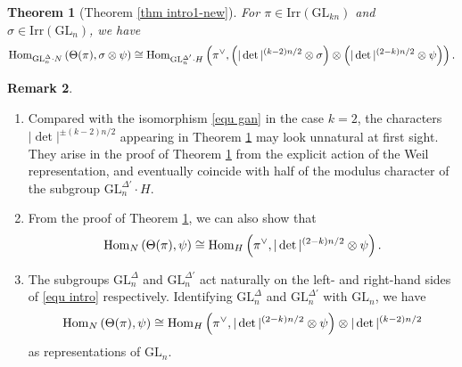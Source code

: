 \documentclass[11pt,reqno]{amsart}
\renewcommand{\1}{{\mathbf{1}}} \newcommand{\sB}{{\mathscr{B}}}
\newcommand{\GL}{{\mathrm{GL}}}\newcommand{\G}{{\mathrm{G}}}
\newcommand{\Irr}{{\mathrm{Irr}}} \newcommand{\cInd}{{\mathrm{c-Ind}}}
\theoremstyle{plain}
\newtheorem{thm}{Theorem}[section] \newtheorem{cor}[thm]{Corollary}
\theoremstyle{definition}
\newtheorem{rem}[thm]{Remark} \newtheorem{fact}[thm]{Fact}
\numberwithin{equation}{section}
\begin{document}
\begin{thm}[Theorem \ref{thm intro1-new}]\label{thm intro1}
For $\pi\in\Irr(\GL_{kn})$ and $\sigma\in\Irr(\GL_n)$, we have
$$\begin{aligned}\Hom_{\GL_n^{\Delta}\cdot N}\left(\Theta(\pi),\sigma\otimes\psi\right) \cong
\Hom_{\GL_n^{\Delta'}\cdot H}\left(\pi^\vee,
\left(|\det|^{(k-2)n/2}\otimes\sigma\right)\otimes\left(|\det|^{(2-k)n/2}\otimes\psi\right)\right).\end{aligned}$$
\end{thm}

\begin{rem}
\begin{enumerate}
\item Compared with the isomorphism \eqref{equ gan} in the case $k=2$, the characters $|\det|^{\pm(k-2)n/2}$ appearing in Theorem \ref{thm intro1} may look unnatural at first sight. They arise in the proof of Theorem \ref{thm intro1} from the explicit action of the Weil representation,  and eventually coincide with half of the modulus character of the subgroup $\GL_n^{\Delta'}\cdot H$.  
\item From the proof of Theorem \ref{thm intro1}, we can also show that
\begin{equation}\label{equ intro}{\mathrm{Hom}}_{ N}\left(\Theta(\pi),\psi\right)\cong
{\mathrm{Hom}}_{H}\left(\pi^\vee,
|\det|^{(2-k)n/2}\otimes\psi\right).\end{equation}
\item The subgroups $\GL_n^{\Delta}$ and $\GL_n^{\Delta'}$ act naturally on the left- and right-hand sides of  \eqref{equ intro} respectively. Identifying $\GL_n^{\Delta}$ and $\GL_n^{\Delta'}$ with $\GL_n$, we have
\begin{equation}\label{rem intro2}{\mathrm{Hom}}_{ N}\left(\Theta(\pi),\psi\right)\cong
{\mathrm{Hom}}_{H}\left(\pi^\vee,
|\det|^{(2-k)n/2}\otimes\psi\right)\otimes|\det|^{(k-2)n/2} \end{equation}
as representations of $\GL_n$.
\end{enumerate}
\end{rem}
\end{document}
